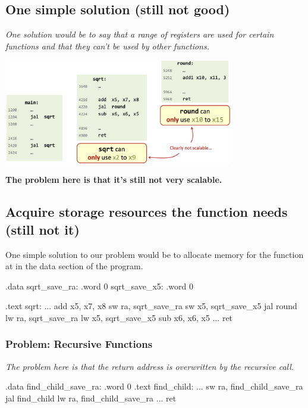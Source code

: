 \subsection{One simple solution (still not good)}
\textit{One solution would be to say that a range of registers are used for certain functions and that they can't be used by other functions.}
\begin{center}
    \includegraphics[width=0.75\textwidth]{chapters/chapter1b/images/function3.png}
\end{center}
\textbf{The problem here is that it's still not very scalable.}
\subsection{Acquire storage resources the function needs (still not it)}
One simple solution to our problem would be to allocate memory for the function at in the data section of the program. \\
\begin{minipage}[htp]{0.4\textwidth}
\begin{assembly}
.data
sqrt_save_ra: .word 0
sqrt_save_x5: .word 0 
\end{assembly}
\end{minipage}
\hfill
\vline
\hfill
\begin{minipage}[htp]{0.4\textwidth}
\begin{assembly}
.text
sqrt:
...
add x5, x7, x8
sw ra, sqrt_save_ra
sw x5, sqrt_save_x5
jal round
lw ra, sqrt_save_ra
lw x5, sqrt_save_x5
sub x6, x6, x5
...
ret
\end{assembly}
\end{minipage}
\subsubsection{Problem: Recursive Functions}
\textit{The problem here is that the return address is overwritten by the recursive call.}
\begin{center}
\begin{assembly}
.data
    find_child_save_ra: .word 0
.text
    find_child:
    ...
    sw ra, find_child_save_ra
    jal find_child
    lw ra, find_child_save_ra
    ...
    ret
\end{assembly}
\end{center}
